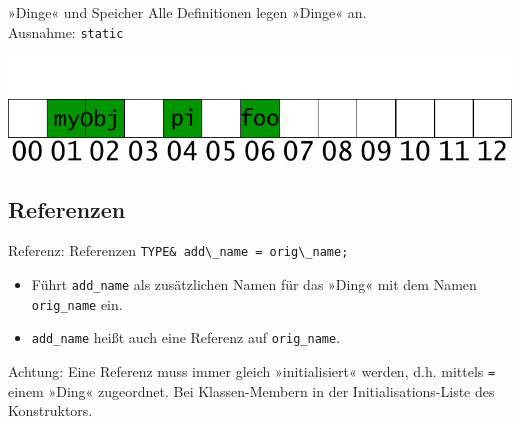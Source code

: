 \begin{frame}[fragile]{»Dinge« und Speicher}
	Alle Definitionen legen »Dinge« an.\\
	{\tiny Ausnahme: \verb|static|}
	
	{\footnotesize
	\begin{block}{}
		
	\end{block}
	}
	
	\pause
	\vspace{1em}
	
	\includegraphics[width=\linewidth]{images/object_things}
\end{frame}


\subsection{Referenzen}

\begin{frame}[fragile]{Referenz: Referenzen}
	\verb|TYPE& add\_name = orig\_name;|
	\begin{itemize}
		\item Führt \verb|add_name| als zusätzlichen Namen für das »Ding« mit dem Namen \verb|orig_name| ein.
		\item \verb|add_name| heißt auch eine Referenz auf \verb|orig_name|.
	\end{itemize}
	
	\vspace{2em}
	
	Achtung: Eine Referenz muss immer gleich »initialisiert« werden, d.h. mittels \verb|=| einem »Ding« zugeordnet. {\tiny Bei Klassen-Membern in der Initialisations-Liste des Konstruktors.}
\end{frame}

